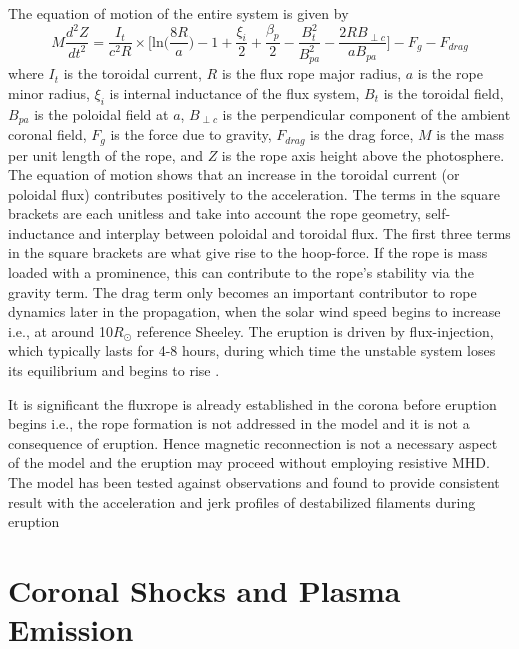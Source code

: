 The equation of motion of the entire system is given by
\begin{equation}
M\frac{d^2Z}{dt^2} = \frac{I_t}{c^2R}\times\bigg[ \mathrm{ln}\bigg(\frac{8R}{a}\bigg) -1+ \frac{\xi_i}{2} + \frac{\beta_p}{2} -\frac{B^2_t}{B^2_{pa}}  -\frac{2RB_{\perp c}}{aB_{pa}} \bigg] - F_g - F_{drag}
\end{equation}
where $I_t$ is the toroidal current, $R$ is the flux rope major radius, $a$ is the rope minor radius, $\xi_i$ is internal inductance of the flux system, $B_t$ is the toroidal field, $B_{pa}$ is the poloidal field at $a$, $B_{\perp c}$ is the perpendicular component of the ambient coronal field, $F_g$ is the force due to gravity, $F_{drag}$ is the drag force, $M$ is the mass per unit length of the rope, and $Z$ is the rope axis height above the photosphere. The equation of motion shows that an increase in the toroidal current (or poloidal flux) contributes positively to the acceleration. The terms in the square brackets are each unitless and take into account the rope geometry, self-inductance and interplay between poloidal and toroidal flux. The first three terms in the square brackets are what give rise to the hoop-force. If the rope is mass loaded with a prominence, this can contribute to the rope's stability via the gravity term. The drag term only becomes an important contributor to rope dynamics later in the propagation, when the solar wind speed begins to increase i.e., at around 10$R_{\odot}$ reference Sheeley. The eruption is driven by flux-injection, which typically lasts for 4-8 hours, during which time the unstable system loses its equilibrium and begins to rise \citet{krall2001}.

It is significant the fluxrope is already established in the corona before eruption begins i.e., the rope formation is not addressed in the model and it is not a consequence of eruption. Hence magnetic reconnection is not a necessary aspect of the model and the eruption may proceed without employing resistive MHD. The model has been tested against observations and found to provide consistent result with the acceleration and jerk profiles of destabilized filaments during eruption \citep{schrijver2008}

\section{Coronal Shocks and Plasma Emission}\label{sec:3}

